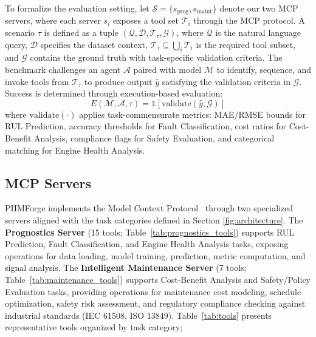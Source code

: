 \documentclass[sigconf,review]{acmart}
\begin{document}
  To formalize the evaluation setting, let $\mathcal{S} = \{s_{\text{prog}},               
  s_{\text{maint}}\}$                                                                      
  denote our two MCP servers, where each server $s_i$ exposes a tool set $\mathcal{T}_i$   
  through the MCP protocol. A scenario $\tau$ is defined as a tuple $(\mathcal{Q},         
  \mathcal{D},                                                                             
  \mathcal{T}_{\tau}, \mathcal{G})$, where $\mathcal{Q}$ is the natural language query,    
  $\mathcal{D}$ specifies the dataset context, $\mathcal{T}_{\tau} \subseteq \bigcup_i     
  \mathcal{T}_i$ is the required tool subset, and $\mathcal{G}$ contains the ground truth  
  with task-specific validation criteria. The benchmark challenges an agent $\mathcal{A}$  
  paired with model $\mathcal{M}$ to identify, sequence, and invoke tools from             
  $\mathcal{T}_{\tau}$ to produce output $\hat{y}$ satisfying the validation criteria in   
  $\mathcal{G}$. Success is determined through execution-based evaluation:                 
  \begin{equation}                                                                         
      E(\mathcal{M}, \mathcal{A}, \tau) = \mathbb{1}[\text{validate}(\hat{y}, \mathcal{G})]
  \end{equation}                                                                           
  where $\text{validate}(\cdot)$ applies task-commensurate metrics: MAE/RMSE bounds for RUL 
  Prediction, accuracy thresholds for Fault Classification, cost ratios for Cost-Benefit   
  Analysis, compliance flags for Safety Evaluation, and categorical matching for Engine    
  Health Analysis.                                                                              
\subsection{MCP Servers}                                          
  PHMForge implements the Model Context Protocol~\cite{wang2025mcpbenchbenchmarkingtoolusingllm} through two specialized    
  servers aligned with the task categories defined in Section \ref{fig:architecture}.   
  The \textbf{Prognostics Server} (15 tools; Table~\ref{tab:prognostics_tools}) supports RUL Prediction, Fault Classification,
  and Engine Health Analysis tasks, exposing operations for data loading, model training,
  prediction, metric computation, and signal analysis. The \textbf{Intelligent Maintenance
  Server} (7 tools; Table~\ref{tab:maintenance_tools}) supports Cost-Benefit Analysis and Safety/Policy Evaluation tasks,    
  providing operations for maintenance cost modeling, schedule optimization, safety risk   
  assessment, and regulatory compliance checking against industrial standards (IEC 61508,  
  ISO 13849). Table~\ref{tab:tools} presents representative tools organized by task        
  category;
\end{document}
